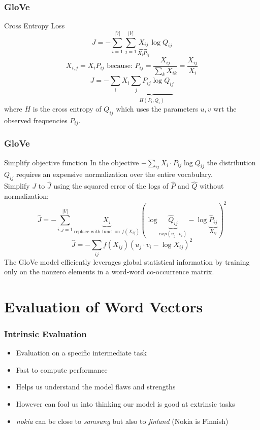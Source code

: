 \begin{frame}
\frametitle{GloVe}
\begin{alertblock}{Cross Entropy Loss}
\[ J = - \sum_{i=1}^{|V|} \sum_{j=1}^{|V|} \underbrace{X_{ij}}_{X_i P_{ij}} \log Q_{ij} \]
 \[ \textrm{$X_{i,j} = X_i P_{ij}$ because: } P_{ij} = \frac{X_{ij}}{\sum_{k} X_{ik}} = \frac{X_{ij}}{X_i} \]
\[ J = - \sum_i X_i \underbrace{\sum_j P_{ij} \log Q_{ij}}_{H(P_i, Q_i)} \]
where $H$ is the cross entropy of $Q_{ij}$ which uses the parameters $u, v$ wrt the observed frequencies $P_{ij}$.
\end{alertblock}
\end{frame}


\begin{frame}
\frametitle{GloVe}
\begin{alertblock}{Simplify objective function}
 In the objective $- \sum_{ij} X_i \cdot P_{ij} \log Q_{ij}$ the distribution $Q_{ij}$ requires an expensive normalization over the entire vocabulary.\\
Simplify $J$ to $\hat{J}$ using the squared error of the logs of $\hat{P}$ and $\hat{Q}$ without normalization:
\[ \hat{J} = - \sum_{i,j=1}^{|V|} \underbrace{X_i}_{\textrm{replace with function $f(X_{ij})$}} \left( \log \underbrace{\hat{Q}_{ij}}_{exp(u_j \cdot v_i)} - \log \underbrace{\hat{P}_{ij}}_{X_{ij}} \right)^2 \]
\[ \hat{J} = - \sum_{ij} f(X_{ij})  ( u_j \cdot v_i - \log X_{ij} )^2 \] 
The GloVe model efficiently leverages global statistical information by training only on the nonzero elements in a word-word co-occurrence matrix.
\end{alertblock}
\end{frame}

\section{Evaluation of Word Vectors}
\frame{\tableofcontents[currentsection]}

\begin{frame}
	\frametitle{Intrinsic Evaluation}
	\begin{itemize}[<+->]
		\item Evaluation on a specific intermediate task
		\item Fast to compute performance
		\item Helps us understand the model flaws and strengths
		\item However can fool us into thinking our model is good at extrinsic tasks
		\item {\it nokia} can be close to {\it samsung} but also to {\it finland} (Nokia is Finnish)
	\end{itemize}
\end{frame}


